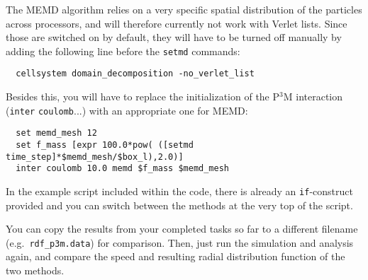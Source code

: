 \documentclass[
a4paper,                        %
11pt,                           %
twoside,                        %
footsepline,                    %
headsepline,                    %
headexclude,                    %
footexclude,                    %
pagesize,                       %
]{scrartcl}
\begin{document}
The MEMD algorithm relies on a very specific spatial distribution of
the particles across processors, and will therefore currently not work
with Verlet lists. Since those are switched on by default, they will
have to be turned off manually by adding the following line before the
\verb|setmd| commands:

\begin{lstlisting}
  cellsystem domain_decomposition -no_verlet_list
\end{lstlisting}


Besides this, you will have to replace the initialization of the
P$^3$M interaction (\verb|inter| \verb|coulomb|...) with an
appropriate one for MEMD:

\begin{lstlisting}
  set memd_mesh 12
  set f_mass [expr 100.0*pow( ([setmd time_step]*$memd_mesh/$box_l),2.0)]
  inter coulomb 10.0 memd $f_mass $memd_mesh
\end{lstlisting}


In the example script included
within the \es{} code, there is already an \verb|if|-construct 
provided and you can switch between the methods at the very top
of the script.

You can copy the results from your completed tasks so far to a different
filename (e.g.~\verb|rdf_p3m.data|) for comparison. Then, just
run the simulation and analysis again, and compare the speed and 
resulting radial distribution function of the two methods.
\fi
\end{document}
